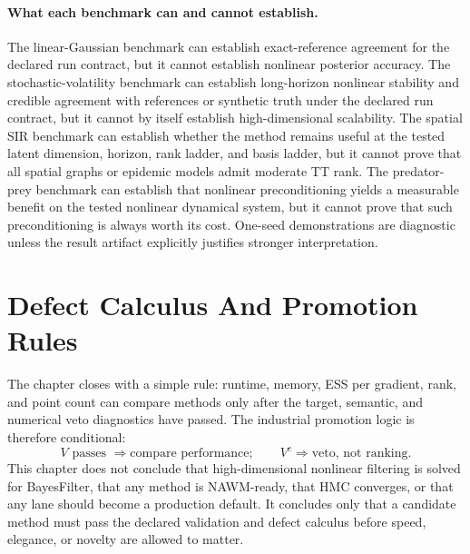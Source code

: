 \paragraph{What each benchmark can and cannot establish.}
The linear-Gaussian benchmark can establish exact-reference agreement for the
declared run contract, but it cannot establish nonlinear posterior accuracy.  The
stochastic-volatility benchmark can establish long-horizon nonlinear stability and
credible agreement with references or synthetic truth under the declared run
contract, but it cannot by itself establish high-dimensional scalability.  The
spatial SIR benchmark can establish whether the method remains useful at the
tested latent dimension, horizon, rank ladder, and basis ladder, but it cannot
prove that all spatial graphs or epidemic models admit moderate TT rank.  The
predator-prey benchmark can establish that nonlinear preconditioning yields a
measurable benefit on the tested nonlinear dynamical system, but it cannot prove
that such preconditioning is always worth its cost.  One-seed demonstrations are
diagnostic unless the result artifact explicitly justifies stronger
interpretation.

\section{Defect Calculus And Promotion Rules}
\label{sec:bf-hd-promotion-logic}

The chapter closes with a simple rule: runtime, memory, ESS per gradient, rank,
and point count can compare methods only after the target, semantic, and
numerical veto diagnostics have passed.  The industrial promotion logic is
therefore conditional:
\begin{equation}
  V \text{ passes } \Longrightarrow \text{compare performance};
  \qquad
  V^c \Longrightarrow \text{veto, not ranking.}
  \label{eq:bf-hd-validation-veto-logic}
\end{equation}
This chapter does not conclude that high-dimensional nonlinear filtering is
solved for BayesFilter, that any method is NAWM-ready, that HMC converges, or
that any lane should become a production default.  It concludes only that a
candidate method must pass the declared validation and defect calculus before
speed, elegance, or novelty are allowed to matter.
